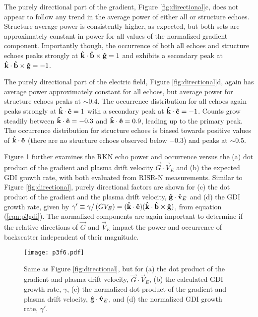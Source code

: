 The purely directional part of the gradient, Figure \ref{fig:directional}c, does not appear to follow any trend in the average power of either all or structure echoes.  Structure average power is consistently higher, as expected, but both sets are approximately constant in power for all values of the normalized gradient component.  Importantly though, the occurrence of both all echoes and structure echoes peaks strongly at \(\mathbf{\hat{k}}\cdot\mathbf{\hat{b}}\times\mathbf{\hat{g}} = 1\) and exhibits a secondary peak at \(\mathbf{\hat{k}}\cdot\mathbf{\hat{b}}\times\mathbf{\hat{g}} = -1\).

The purely directional part of the electric field, Figure \ref{fig:directional}d, again has average power approximately constant for all echoes, but average power for structure echoes peaks at \(\sim\)0.4.  The occurrence distribution for all echoes again peaks strongly at \(\mathbf{\hat{k}}\cdot\mathbf{\hat{e}} = 1\) with a secondary peak at \(\mathbf{\hat{k}}\cdot\mathbf{\hat{e}} = -1\). Counts grow steadily between \(\mathbf{\hat{k}}\cdot\mathbf{\hat{e}} = -0.3\) and \(\mathbf{\hat{k}}\cdot\mathbf{\hat{e}} = 0.9\), leading up to the primary peak.  The occurrence distribution for structure echoes is biased towards positive values of \(\mathbf{\hat{k}}\cdot\mathbf{\hat{e}}\) (there are no structure echoes observed below $-$0.3) and peaks at \(\sim\)0.5.

Figure \ref{fig:gamma} further examines the RKN echo power and occurrence versus the (a) dot product of the gradient and plasma drift velocity \(\vec{G}\cdot\vec{V}_E\) and (b) the expected GDI growth rate, with both evaluated from RISR-N measurements.  Similar to Figure \ref{fig:directional}, purely directional factors are shown for (c) the dot product of the gradient and the plasma drift velocity, \(\mathbf{\hat{g}}\cdot\mathbf{\hat{v}}_E\)  and (d) the GDI growth rate, given by \(\gamma^\prime \equiv \gamma/\left(GV_E\right) = (\mathbf{\hat{k}}\cdot\mathbf{\hat{e}})(\mathbf{\hat{k}}\cdot\mathbf{\hat{b}}\times\mathbf{\hat{g}})\), from equation (\ref{eqn:p3gdi}).  The normalized components are again important to determine if the relative directions of \(\vec{G}\) and \(\vec{V}_E\) impact the power and occurrence of backscatter independent of their magnitude.

\begin{figure}
	\texttt{[image: p3f6.pdf]}
  \caption[Irregularity dependence on GDI growth rate]{Same as Figure \ref{fig:directional}, but for (a) the dot product of the gradient and plasma drift velocity, \(\vec{G}\cdot\vec{V}_E\), (b) the calculated GDI growth rate, \(\gamma\), (c) the normalized dot product of the  gradient and plasma drift velocity, \(\mathbf{\hat{g}}\cdot\mathbf{\hat{v}}_E\), and (d) the normalized GDI growth rate, \(\gamma'\).}
  \label{fig:gamma}
\end{figure}

